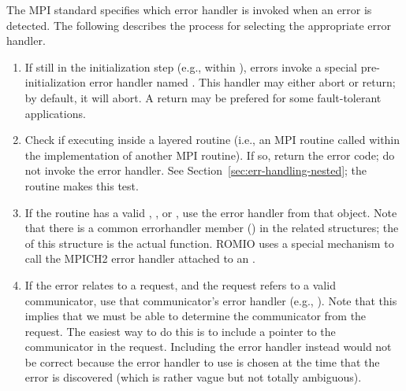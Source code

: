 \documentclass{article}
\begin{document}
The MPI standard specifies which error handler is invoked when an error is
detected.  The following describes the process for selecting the appropriate
error handler.

\begin{enumerate}
\item If still in the initialization step (e.g., within
), errors invoke a special pre-initialization error
handler named .  This handler may either abort or
return; by default, it will abort. 
A return may be prefered for some fault-tolerant applications.

\item Check if executing inside a layered routine (i.e., an MPI routine called
  within the implementation of another MPI routine).  If so, return
  the error
  code; do not invoke the error handler.  See
  Section~\ref{sec:err-handling-nested}; the  routine
  makes this test.

\item If the routine has a valid , , or
  , use the error handler from that object.  Note that there is
  a common errorhandler member () in the related structures;
  the  of this structure is the actual function.
  ROMIO uses a special mechanism to call the MPICH2 error handler
  attached to an .

\item If the error relates to a request, and the request refers to a valid
  communicator, use that communicator's error handler (e.g., ).
  Note that this implies that we must be able to determine the communicator
  from the request.  The easiest way to do this is to include a
  pointer to the communicator in the request.  Including the error
  handler instead would not be correct because the error handler to
  use is chosen at the time that the error is discovered (which is
  rather vague but not totally ambiguous).



\end{enumerate}
\end{document}
